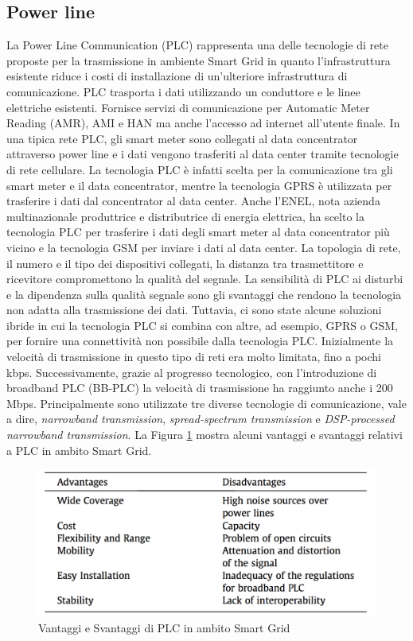 \subsection{Power line}
La Power Line Communication (PLC) rappresenta una delle tecnologie di rete proposte per la trasmissione in ambiente Smart Grid in quanto l'infrastruttura esistente riduce i costi di installazione di un'ulteriore infrastruttura di comunicazione. PLC trasporta i dati utilizzando un conduttore e le linee elettriche esistenti. Fornisce servizi di comunicazione per Automatic Meter Reading (AMR), AMI e HAN ma anche l'accesso ad internet all'utente finale. In una tipica rete PLC, gli smart meter sono collegati al data concentrator attraverso power line e i dati vengono trasferiti al data center tramite tecnologie di rete cellulare. La tecnologia PLC è infatti scelta per la comunicazione tra gli smart meter e il data concentrator, mentre la tecnologia GPRS è utilizzata per trasferire i dati dal concentrator al data center. Anche l'ENEL, nota azienda multinazionale produttrice e distributrice di energia elettrica, ha scelto la tecnologia PLC per trasferire i dati degli smart meter al data concentrator più vicino e la tecnologia GSM per inviare i dati al data center. 
La topologia di rete, il numero e il tipo dei dispositivi collegati, la distanza tra trasmettitore e ricevitore compromettono la qualità del segnale. La sensibilità di PLC ai disturbi e la dipendenza sulla qualità segnale sono gli svantaggi che rendono la tecnologia non adatta alla trasmissione dei dati. Tuttavia, ci sono state alcune soluzioni ibride in cui la tecnologia PLC si combina con altre, ad esempio, GPRS o GSM, per fornire una connettività non possibile dalla tecnologia PLC. Inizialmente la velocità di trasmissione in questo tipo di reti era molto limitata, fino a pochi kbps. Successivamente, grazie al progresso tecnologico, con l'introduzione di broadband PLC (BB-PLC) la velocità di trasmissione ha raggiunto anche i 200 Mbps. Principalmente sono utilizzate tre diverse tecnologie di comunicazione, vale a dire, \emph{narrowband transmission}, \emph{spread-spectrum transmission} e \emph{DSP-processed narrowband transmission}. La Figura \ref{fig:vs_plc} mostra alcuni vantaggi e svantaggi relativi a PLC in ambito Smart Grid.
\begin{figure}[h]
	\centering
	\includegraphics[scale=0.350]{imgs/vs_plc.png}
	\caption{Vantaggi e Svantaggi di PLC in ambito Smart Grid} \label{fig:vs_plc}
\end{figure}\\
